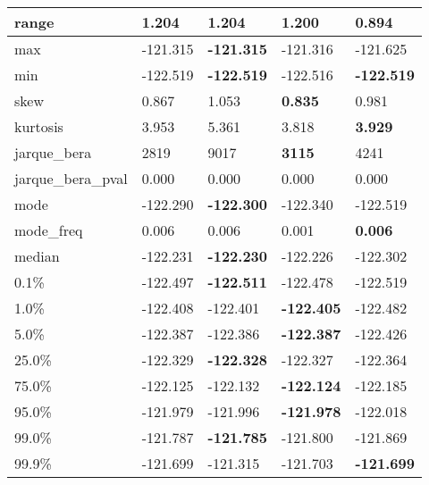 \begin{table}[H]
\begin{tabular}{|l|m{10em}|m{10em}|m{10em}|m{10em}|}
\hline range & 1.204 & \bfseries 1.204 & 1.200 & \cellcolor[rgb]{0.9, 0.54, 0.52} 0.894 \\
\hline max & -121.315 & \bfseries -121.315 & -121.316 & \cellcolor[rgb]{0.9, 0.54, 0.52} -121.625 \\
\hline min & -122.519 & \bfseries -122.519 & \cellcolor[rgb]{0.9, 0.54, 0.52} -122.516 & \bfseries -122.519 \\
\hline skew & 0.867 & \cellcolor[rgb]{0.9, 0.54, 0.52} 1.053 & \bfseries 0.835 & 0.981 \\
\hline kurtosis & 3.953 & \cellcolor[rgb]{0.9, 0.54, 0.52} 5.361 & 3.818 & \bfseries 3.929 \\
\hline jarque\_bera & 2819 & \cellcolor[rgb]{0.9, 0.54, 0.52} 9017 & \bfseries 3115 & 4241 \\
\hline jarque\_bera\_pval & 0.000 & 0.000 & 0.000 & 0.000 \\
\hline mode & -122.290 & \bfseries -122.300 & -122.340 & \cellcolor[rgb]{0.9, 0.54, 0.52} -122.519 \\
\hline mode\_freq & 0.006 & 0.006 & \cellcolor[rgb]{0.9, 0.54, 0.52} 0.001 & \bfseries 0.006 \\
\hline median & -122.231 & \bfseries -122.230 & -122.226 & \cellcolor[rgb]{0.9, 0.54, 0.52} -122.302 \\
\hline 0.1\% & -122.497 & \bfseries -122.511 & -122.478 & \cellcolor[rgb]{0.9, 0.54, 0.52} -122.519 \\
\hline 1.0\% & -122.408 & -122.401 & \bfseries -122.405 & \cellcolor[rgb]{0.9, 0.54, 0.52} -122.482 \\
\hline 5.0\% & -122.387 & -122.386 & \bfseries -122.387 & \cellcolor[rgb]{0.9, 0.54, 0.52} -122.426 \\
\hline 25.0\% & -122.329 & \bfseries -122.328 & -122.327 & \cellcolor[rgb]{0.9, 0.54, 0.52} -122.364 \\
\hline 75.0\% & -122.125 & -122.132 & \bfseries -122.124 & \cellcolor[rgb]{0.9, 0.54, 0.52} -122.185 \\
\hline 95.0\% & -121.979 & -121.996 & \bfseries -121.978 & \cellcolor[rgb]{0.9, 0.54, 0.52} -122.018 \\
\hline 99.0\% & -121.787 & \bfseries -121.785 & -121.800 & \cellcolor[rgb]{0.9, 0.54, 0.52} -121.869 \\
\hline 99.9\% & -121.699 & \cellcolor[rgb]{0.9, 0.54, 0.52} -121.315 & -121.703 & \bfseries -121.699 \\
\hline
\end{tabular}
\end{table}
